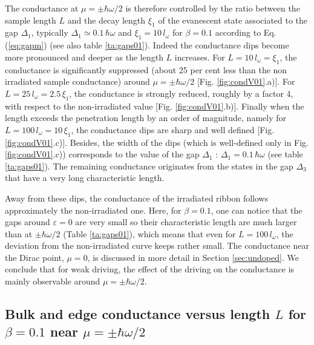 \documentclass[aps,prb,showpacs,superscriptaddress,twocolumn,10pt,floatfix]{revtex4-1}
\newcommand{\ep}{\varepsilon}
\begin{document}
The conductance at $\mu=\pm\hbar\omega/2$ is therefore controlled by the ratio between the sample length $L$ and the decay length $\xi_1$ of the evanescent state associated to the gap $\Delta_1$, typically $\Delta_1 \simeq 0.1 \, \hbar \omega$ and $\xi_1 = 10 \, l_\omega$ for $\beta=0.1$ according to Eq.(\ref{eq:gapm}) (see also table \ref{ta:gaps01}). Indeed the conductance dips become more pronounced and deeper as the length $L$ increases. For $L=10 \, l_\omega=\xi_1$, the conductance is significantly suppressed (about 25 per cent less than the non irradiated sample conductance) around $\mu=\pm\hbar\omega/2$ [Fig. \ref{fig:condV01}.a)]. For $L=25 \, l_\omega=2.5 \, \xi_1$, the conductance is strongly reduced, roughly by a factor 4, with respect to the non-irradiated value [Fig. \ref{fig:condV01}.b)]. Finally when the length exceeds the penetration length by an order of magnitude, namely for $L=100 \,  l_\omega=10  \, \xi_1$, the conductance dips are sharp and well defined [Fig. \ref{fig:condV01}.c)]. Besides, the width of the dips (which is well-defined only in Fig. \ref{fig:condV01}.c)) corresponds to the value of the gap $\Delta_1$ : $\Delta_1=0.1 \,  \hbar\omega$ (see table \ref{ta:gaps01}). The remaining conductance originates from the states in the gap $\Delta_3$ that have a very long characteristic length. 

Away from these dips, the conductance of the irradiated ribbon follows approximately the non-irradiated one. Here, for $\beta=0.1$, one can notice that the gaps around $\ep=0$ are very small so their characteristic length are much larger than at $\pm\hbar\omega/2$ (Table \ref{ta:gaps01}), which means that even for $L=100 \,  l_\omega$, the deviation from the non-irradiated curve keeps rather small. The conductance near the Dirac point, $\mu=0$, is discussed in more detail in Section \ref{sec:undoped}. We conclude that for weak driving, the effect of the driving on the conductance is mainly observable around $\mu=\pm\hbar\omega/2$. 

\medskip

\subsection{Bulk and edge conductance versus length $L$ for $\beta=0.1$ near $\mu=\pm\hbar\omega/2$} 


\label{sec:condL_mu05}
\end{document}

